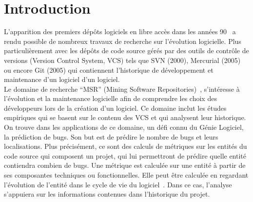 \section{Introduction}
\label{sec:intro}

L'apparition des premiers dépôts logiciels en libre accès dans les années 90~\cite{list_vcs} a rendu possible de nombreux travaux de recherche sur l'évolution logicielle. Plus particulièrement avec les dépôts de code source gérés par des outils de contrôle de versions (Version Control System, VCS) tels que  SVN (2000), Mercurial (2005) ou encore Git (2005) qui contiennent l'historique de développement et maintenance d'un logiciel d'un logiciel.\\  

Le domaine de recherche ``MSR'' (Mining Software Repositories)~\cite{herzig-makingsoftware-2010}, s'intéresse à l'évolution et la maintenance logicielle afin de comprendre les choix des développeurs lors de la création d'un logiciel. Ce domaine inclut les études empiriques qui se basent sur le contenu des VCS et qui analysent leur historique.\\


On trouve dans les applications de ce domaine, un défi connu du Génie Logiciel, la prédiction de bugs. Son but est de prédire le nombre de bugs et leurs localisations. Plus précisément, ce sont des calculs de métriques sur les entités du code source qui composent un projet, qui lui permettront de prédire quelle entité contiendra combien de bugs. Une métrique est calculée sur une entité à partir de ses composantes techniques ou fonctionnelles. Elle peut être calculée en regardant l'évolution de l'entité dans le cycle de vie du logiciel~\cite{dambros_relationship_2009,caglayan_merits_2009}. Dans ce cas, l'analyse s'appuiera sur les informations contenues dans l'historique du projet.


